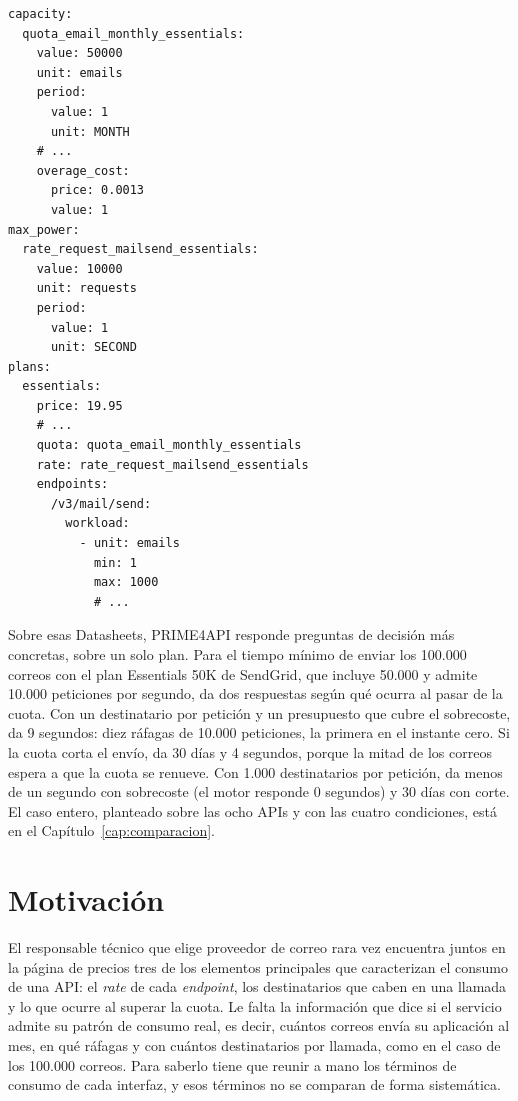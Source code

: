 \begin{lstlisting}[style=datasheetyaml,float=tbp,caption={Fragmento de la Datasheet de SendGrid del catálogo: la cuota mensual del plan Essentials 50K con su sobrecoste, el \textit{rate} de envío, que la Datasheet declara en el plan, y el plan, con su precio en USD al mes y el tope de correos por petición. Las líneas \texttt{\# ...} marcan lo que se omite.},label={lst:introduccion:sendgrid}]
capacity:
  quota_email_monthly_essentials:
    value: 50000
    unit: emails
    period:
      value: 1
      unit: MONTH
    # ...
    overage_cost:
      price: 0.0013
      value: 1
max_power:
  rate_request_mailsend_essentials:
    value: 10000
    unit: requests
    period:
      value: 1
      unit: SECOND
plans:
  essentials:
    price: 19.95
    # ...
    quota: quota_email_monthly_essentials
    rate: rate_request_mailsend_essentials
    endpoints:
      /v3/mail/send:
        workload:
          - unit: emails
            min: 1
            max: 1000
            # ...
\end{lstlisting}

Sobre esas Datasheets, PRIME4API \citep{prime4apirepo} responde preguntas de
decisión más concretas, sobre un solo plan. Para el tiempo mínimo de enviar los 100.000
correos con el plan Essentials 50K de SendGrid, que incluye 50.000 y admite
10.000 peticiones por segundo, da dos respuestas según qué ocurra al pasar de
la cuota. Con un destinatario por petición y un presupuesto que cubre el
sobrecoste, da 9 segundos: diez ráfagas de 10.000 peticiones, la primera en el
instante cero. Si la cuota corta el envío, da 30 días y 4 segundos, porque la
mitad de los correos espera a que la cuota se renueve. Con 1.000
destinatarios por petición, da menos de un segundo con sobrecoste (el motor
responde 0 segundos) y 30 días con corte. El caso entero, planteado sobre las
ocho APIs y con las cuatro condiciones, está en el
Capítulo~\ref{cap:comparacion}.

\section{Motivación}
\label{sec:introduccion:motivacion}

El responsable técnico que elige proveedor de correo rara vez encuentra juntos
en la página de precios tres de los elementos principales que caracterizan el
consumo de una API: el \textit{rate} de cada \textit{endpoint}, los
destinatarios que caben en una llamada y lo que ocurre al superar la cuota. Le
falta la información que dice si el servicio admite su patrón de
consumo real, es decir, cuántos correos envía su aplicación al mes, en qué
ráfagas y con cuántos destinatarios por llamada, como en el caso de los
100.000 correos. Para saberlo tiene que reunir a mano los términos de consumo
de cada interfaz, y esos términos no se comparan de forma sistemática.

